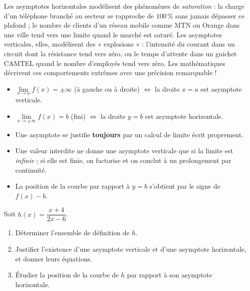 \documentclass[11pt]{article}
\newcommand{\cle}[1]{{\popxbold\color{popdark}#1}}
\begin{document}
\begin{savaistu}
Les asymptotes horizontales modélisent des phénomènes de \emph{saturation} : la charge d'un téléphone branché au secteur se rapproche de $100\,\%$ sans jamais dépasser ce plafond ; le nombre de clients d'un réseau mobile comme MTN ou Orange dans une ville tend vers une limite quand le marché est saturé. Les asymptotes verticales, elles, modélisent des « explosions » : l'intensité du courant dans un circuit dont la résistance tend vers zéro, ou le temps d'attente dans un guichet CAMTEL quand le nombre d'employés tend vers zéro. Les mathématiques décrivent ces comportements extrêmes avec une précision remarquable !
\end{savaistu}

\begin{aretenir}
\begin{itemize}
\item $\lim\limits_{x \to a} f(x) = \pm\infty$ (à gauche ou à droite) $\Longleftrightarrow$ la droite $x = a$ est \cle{asymptote verticale}.
\item $\lim\limits_{x \to \pm\infty} f(x) = b$ (fini) $\Longleftrightarrow$ la droite $y = b$ est \cle{asymptote horizontale}.
\item Une asymptote se justifie \textbf{toujours} par un calcul de limite écrit proprement.
\item Une valeur interdite ne donne une asymptote verticale que si la limite est \emph{infinie} ; si elle est finie, on factorise et on conclut à un prolongement par continuité.
\item La position de la courbe par rapport à $y = b$ s'obtient par le signe de $f(x) - b$.
\end{itemize}
\end{aretenir}

\begin{exercice}
Soit $h(x) = \dfrac{x + 4}{2x - 6}$.
\begin{enumerate}
\item Déterminer l'ensemble de définition de $h$.
\item Justifier l'existence d'une asymptote verticale et d'une asymptote horizontale, et donner leurs équations.
\item Étudier la position de la courbe de $h$ par rapport à son asymptote horizontale.
\end{enumerate}
\end{exercice}
\end{document}
